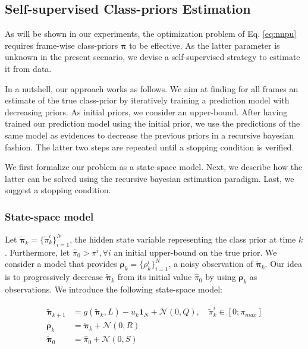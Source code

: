 \subsection{Self-supervised Class-priors Estimation}
\label{sec:pi_estim}

As will be shown in our experiments, the optimization problem of Eq. \ref{eq:nnpu} requires frame-wise class-priors $\bm{\pi}$ to be effective.
As the latter parameter is unknown in the present scenario,
we devise a self-supervised strategy to estimate it from data.

In a nutshell, our approach works as follows.
We aim at finding for all frames an estimate of the true class-prior by iteratively training a prediction model with decreasing priors.
As initial priors, we consider an upper-bound.
After having trained our prediction model using the initial prior, we use the predictions of the same model as evidences to decrease the previous priors in a recursive bayesian fashion.
The latter two steps are repeated until a stopping condition is verified.

We first formalize our problem as a state-space model.
Next, we describe how the latter can be solved using the recursive bayesian estimation paradigm.
Last, we suggest a stopping condition.

\subsubsection{State-space model}

Let $\bm{\tilde\pi}_k=\{\tilde\pi_{k}^{i}\}_{i=1}^N$,
the hidden state variable representing the class prior at time $k$.
Furthermore, let $\hat \pi_0 > \pi^{i}, \forall i$ an initial upper-bound on the true prior.
We consider a model that provides \(\bm{\rho}_k=\{\rho_{k}^i\}_{i=1}^N\), a noisy observation of $\bm{\tilde\pi}_{k}$.
Our idea is to progressively decrease $\bm{\tilde\pi}_{k}$ from its initial value $\hat \pi_{0}$ by using $\bm{\rho}_{k}$ as observations.
We introduce the following state-space model:

\begin{align}
\bm{\bm{\tilde\pi}}_{k+1} &= g(\bm{\tilde\pi}_{k}, L) - u_{k}\mathbf{1}_{N} + \mathcal{N}(0,Q), \quad \tilde\pi_{k}^{i} \in [0; \pi_{{max}}] \label{eq:trans_fn}\\
\bm{\bm{\rho}}_{k} &= \bm{\tilde\pi}_{k} + \mathcal{N}(0,R) \label{eq:proc_fn} \\
\bm{\tilde\pi}_{0}&=\hat \pi_{0} + \mathcal{N}(0,S) \label{eq:init_fn}
\end{align}

